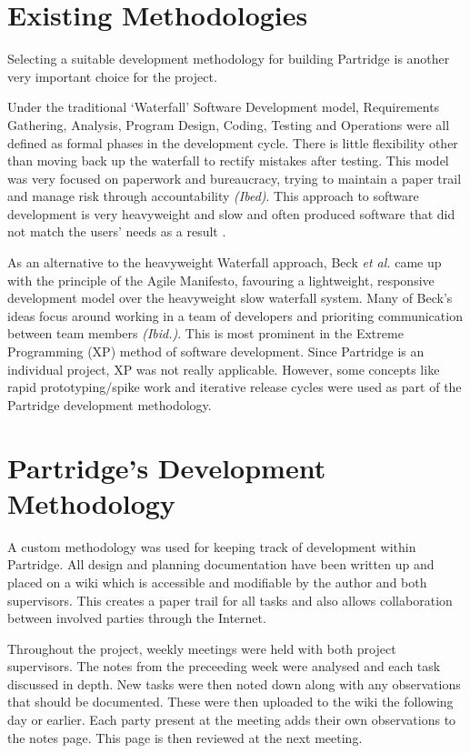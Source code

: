 \section{Existing Methodologies}
Selecting a suitable development methodology for building Partridge is another
very important choice for the project.

Under the traditional `Waterfall' Software Development model, Requirements
Gathering, Analysis, Program Design, Coding, Testing and Operations were all
defined as formal phases in the development cycle. There is little flexibility
other than moving back up the waterfall to rectify mistakes after
testing\cite{Royce:1987:MDL:41765.41801}. This model was very focused on
paperwork and bureaucracy, trying to maintain a paper trail and manage risk
through accountability \emph{(Ibed)}. This approach to software development is
very heavyweight and slow and often produced software that did not match the
users' needs as a result \cite{Boehm1988}.

As an alternative to the heavyweight Waterfall approach, Beck \emph{et al.} came up
with the principle of the Agile Manifesto, favouring a lightweight, responsive
development model over the heavyweight slow waterfall
system\cite{beck2001agile}. Many of Beck's ideas focus around working in a team
of developers and prioriting communication between team members \emph{(Ibid.)}.
This is most prominent in the Extreme Programming (XP) method of software
development. Since Partridge is an individual project, XP was not really
applicable. However, some concepts like rapid prototyping/spike work and
iterative release cycles were used as part of the Partridge development
methodology.

\section{ Partridge's Development Methodology}

A custom methodology was used for keeping track of development within
Partridge.  All design and planning documentation have been written up and
placed on a wiki which is accessible and modifiable by the author and both
supervisors. This creates a paper trail for all tasks and also allows
collaboration between involved parties through the Internet.

Throughout the project, weekly meetings were held with both project
supervisors. The notes from the preceeding week were analysed and each task
discussed in depth. New tasks were then noted down along with any observations
that should be documented. These were then uploaded to the wiki the following
day or earlier. Each party present at the meeting adds their own observations
to the notes page. This page is then reviewed at the next meeting.

